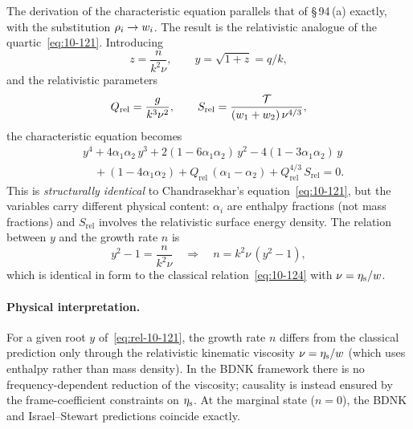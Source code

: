 The derivation of the characteristic equation parallels that of
\S\,94\,(a) exactly, with the substitution
$\rho_{i} \to w_{i}$.  The
result is the relativistic analogue of the quartic~\eqref{eq:10-121}.
Introducing
\begin{equation}\label{eq:rel-10-117}
  z
  = \frac{n}{k^{2}\nu},
  \qquad
  y = \sqrt{1+z} = q/k,
\end{equation}
and the relativistic parameters
\begin{equation}\label{eq:rel-10-120}
  Q_{\mathrm{rel}}
  = \frac{g}{k^{3}\nu^{2}},
  \qquad
  S_{\mathrm{rel}}
  = \frac{\mathcal{T}}{(w_{1}+w_{2})\,\nu^{4/3}},
\end{equation}
the characteristic equation becomes
\begin{equation}\label{eq:rel-10-121}
  \boxed{
  \begin{aligned}
  &y^{4}+4\alpha_{1}\alpha_{2}\,y^{3}
    + 2(1-6\alpha_{1}\alpha_{2})\,y^{2}
    - 4(1-3\alpha_{1}\alpha_{2})\,y \\
  &\quad + (1-4\alpha_{1}\alpha_{2})
    + Q_{\mathrm{rel}}\,(\alpha_{1}-\alpha_{2})
    + Q_{\mathrm{rel}}^{4/3}\,S_{\mathrm{rel}} = 0.
  \end{aligned}
  }
\end{equation}
This is \emph{structurally identical} to Chandrasekhar's
equation~\eqref{eq:10-121}, but the variables carry different
physical content: $\alpha_{i}$ are enthalpy fractions (not mass
fractions) and $S_{\mathrm{rel}}$ involves the relativistic surface
energy density.  The relation between $y$ and the growth rate $n$
is
\begin{equation}\label{eq:rel-10-n-from-y}
  y^{2} - 1
  = \frac{n}{k^{2}\nu}
  \quad\Longrightarrow\quad
  n = k^{2}\nu\,(y^{2}-1),
\end{equation}
which is identical in form to the classical
relation~\eqref{eq:10-124} with $\nu = \eta_{\mathrm{s}}/w$.

\paragraph{Physical interpretation.}
For a given root $y$ of~\eqref{eq:rel-10-121}, the growth rate $n$
differs from the classical prediction only through the relativistic
kinematic viscosity $\nu = \eta_{\mathrm{s}}/w$ (which uses
enthalpy rather than mass density).  In the BDNK framework there
is no frequency-dependent reduction of the viscosity; causality
is instead ensured by the frame-coefficient constraints on
$\eta_{\mathrm{s}}$.  At the marginal state ($n = 0$), the BDNK and
Israel--Stewart predictions coincide exactly.

